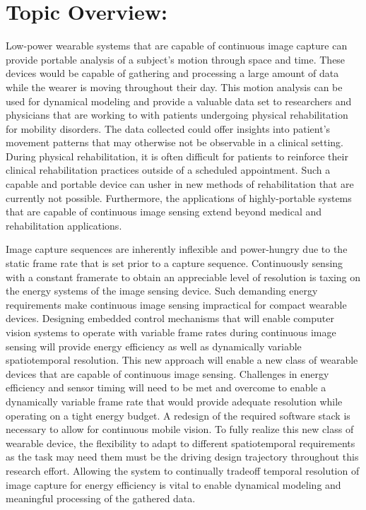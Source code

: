 \section{Topic Overview:}

\indent Low-power wearable systems that are capable of continuous image capture can provide portable analysis of a subject's motion through
space and time. These devices would be capable of gathering and processing a large amount of data while the wearer is moving throughout their
day. This motion analysis can be used for dynamical modeling and provide a valuable data set to researchers and physicians that are working
to with patients undergoing physical rehabilitation for mobility disorders. The data collected could offer insights into patient's movement
patterns that may otherwise not be observable in a clinical setting. During physical rehabilitation, it is often difficult for patients to
reinforce their clinical rehabilitation practices outside of a scheduled appointment. Such a capable and portable device can usher in
new methods of rehabilitation that are currently not possible. Furthermore, the applications of highly-portable systems that are capable of continuous
image sensing extend beyond medical and rehabilitation applications.

\indent Image capture sequences are inherently inflexible and power-hungry due to the static frame rate that is set prior to a capture
sequence. Continuously sensing with a constant framerate to obtain an appreciable level of resolution is taxing on the energy systems of the
image sensing device. Such demanding energy requirements make continuous image sensing impractical for compact wearable devices. Designing embedded
control mechanisms that will enable computer vision systems to operate with variable frame rates during continuous image sensing will provide energy
efficiency as well as dynamically variable spatiotemporal resolution. This new approach will enable a new class of wearable devices that are capable
of continuous image sensing. Challenges in energy efficiency and sensor timing will need to be met and overcome to enable a dynamically variable frame
rate that would provide adequate resolution while operating on a tight energy budget. A redesign of the required software stack is necessary to allow
for continuous mobile vision. To fully realize this new class of wearable device, the flexibility to adapt to different spatiotemporal requirements as
the task may need them must be the driving design trajectory throughout this research effort. Allowing the system to continually tradeoff temporal
resolution of image capture for energy efficiency is vital to enable dynamical modeling and meaningful processing of the gathered data.
